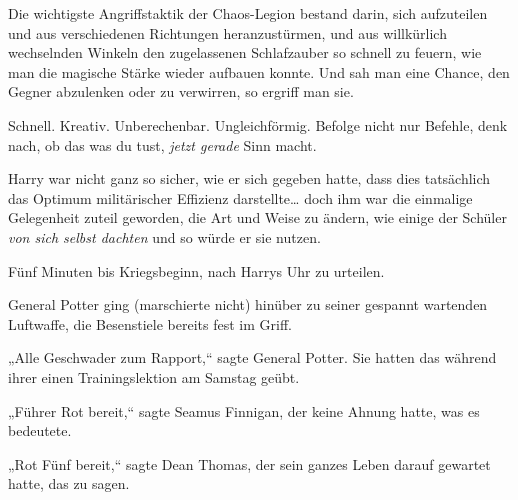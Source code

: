 Die wichtigste Angriffstaktik der Chaos-Legion bestand darin, sich aufzuteilen und aus verschiedenen Richtungen heranzustürmen, und aus willkürlich wechselnden Winkeln den zugelassenen Schlafzauber so schnell zu feuern, wie man die magische Stärke wieder aufbauen konnte. Und sah man eine Chance, den Gegner abzulenken oder zu verwirren, so ergriff man sie.

Schnell. Kreativ. Unberechenbar. Ungleichförmig. Befolge nicht nur Befehle, denk nach, ob das was du tust, \emph{jetzt gerade} Sinn macht.

Harry war nicht ganz so sicher, wie er sich gegeben hatte, dass dies tatsächlich das Optimum militärischer Effizienz darstellte… doch ihm war die einmalige Gelegenheit zuteil geworden, die Art und Weise zu ändern, wie einige der Schüler \emph{von sich selbst dachten} und so würde er sie nutzen.

Fünf Minuten bis Kriegsbeginn, nach Harrys Uhr zu urteilen.

General Potter ging (marschierte nicht) hinüber zu seiner gespannt wartenden Luftwaffe, die Besenstiele bereits fest im Griff.

„Alle Geschwader zum Rapport,“ sagte General Potter. Sie hatten das während ihrer einen Trainingslektion am Samstag geübt.

„Führer Rot bereit,“ sagte Seamus Finnigan, der keine Ahnung hatte, was es bedeutete.

„Rot Fünf bereit,“ sagte Dean Thomas, der sein ganzes Leben darauf gewartet hatte, das zu sagen.

